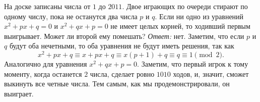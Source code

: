 \problem
На доске записаны числа от $1$ до $2011$.
Двое играющих по очереди стирают по одному числу, пока не останутся два числа
$p$ и $q$.
Если ни одно из уравнений $x^2 + p x + q = 0$ и $x^2 + q x + p = 0$ не имеет
целых корней, то ходивший первым выигрывает.
Может ли второй ему помешать?
\solution
\emph{Ответ:} нет.
Заметим, что если $p$ и $q$ будут оба нечетными, то оба уравнения не будут
иметь решения, так как
\[
   x^2 + p x + q
\equiv
   x + p x + q
\equiv
   x (p + 1) + q
\equiv
   q
\equiv
   1
\pmod{2}
.\]
Аналогично для уравнения $x^2 + q x + p = 0$.
Заметим, что первый игрок к тому моменту, когда останется $2$ числа, сделает
ровно $1010$ ходов, и, значит, сможет выкинуть все четные числа.
Тем самым, как мы продемонстрировали, он выиграет.
\endproblem
